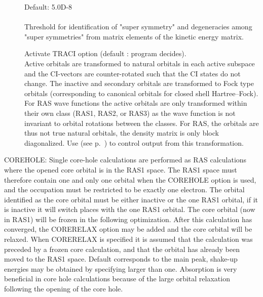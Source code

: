 \begin{description}
\item[] Default: 5.0D-8\\
   \\
  Threshold for identification of "super
  symmetry" and degeneracies among
  "super symmetries" from matrix elements of the kinetic energy matrix.

\item[]
  Activate TRACI option (default : program decides).\\
  Active orbitals are transformed to natural orbitals in each active subspace
  and the CI-vectors are counter-rotated such that the CI states do not change.  The
  inactive and secondary orbitals are transformed to Fock type orbitals
  (corresponding to canonical orbitals for closed shell Hartree--Fock).
  For RAS wave functions the active orbitals are only transformed
  within their own class (RAS1, RAS2, or RAS3) as the wave function is
  not invariant to orbital rotations between the classes.  For RAS, the
  orbitals are thus not true natural orbitals, the density matrix is
  only block diagonalized.  Use  (see
  p.~\pageref{ref-priinp})   to control output from this
  transformation.

\end{description}



COREHOLE: Single core-hole calculations are
performed as RAS calculations where the opened core orbital is in
the RAS1 space.  The RAS1 space must therefore contain one and
only one orbital when the COREHOLE option is used, and the
occupation must be restricted to be exactly one electron. The
orbital identified as the core orbital must be either inactive or
the one RAS1 orbital, if it is inactive it will switch places with
the one RAS1 orbital. The core orbital (now in RAS1) will be
frozen in the following optimization. After this calculation has
converged, the CORERELAX option may be added and the core orbital
will be relaxed.  When CORERELAX is
specified it is assumed that the calculation was preceded by a
frozen core calculation, and that the
orbital has already been moved to the RAS1 space. Default
corresponds to the main peak, shake-up energies may be obtained by
specifying  larger than one. Absorption is
very beneficial in core hole calculations because of the large
orbital relaxation following the opening of the core hole.

